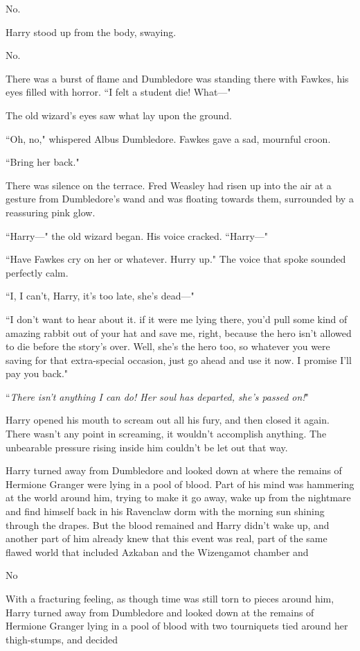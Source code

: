 No.

Harry stood up from the body, swaying.

No.

There was a burst of flame and Dumbledore was standing there with Fawkes, his eyes filled with horror. ``I felt a student die! What---"

The old wizard's eyes saw what lay upon the ground.

``Oh, no," whispered Albus Dumbledore. Fawkes gave a sad, mournful croon.

``Bring her back."

There was silence on the terrace. Fred Weasley had risen up into the air at a gesture from Dumbledore's wand and was floating towards them, surrounded by a reassuring pink glow.

``Harry---" the old wizard began. His voice cracked. ``Harry---"

``Have Fawkes cry on her or whatever. Hurry up." The voice that spoke sounded perfectly calm.

``I, I can't, Harry, it's too late, she's dead---"

``I don't want to hear about it. if it were me lying there, you'd pull some kind of amazing rabbit out of your hat and save me, right, because the hero isn't allowed to die before the story's over. Well, she's the hero too, so whatever you were saving for that extra-special occasion, just go ahead and use it now. I promise I'll pay you back."

``\emph{There isn't anything I can do! Her soul has departed, she's passed on!}"

Harry opened his mouth to scream out all his fury, and then closed it again. There wasn't any point in screaming, it wouldn't accomplish anything. The unbearable pressure rising inside him couldn't be let out that way.

Harry turned away from Dumbledore and looked down at where the remains of Hermione Granger were lying in a pool of blood. Part of his mind was hammering at the world around him, trying to make it go away, wake up from the nightmare and find himself back in his Ravenclaw dorm with the morning sun shining through the drapes. But the blood remained and Harry didn't wake up, and another part of him already knew that this event was real, part of the same flawed world that included Azkaban and the Wizengamot chamber and

No

With a fracturing feeling, as though time was still torn to pieces around him, Harry turned away from Dumbledore and looked down at the remains of Hermione Granger lying in a pool of blood with two tourniquets tied around her thigh-stumps, and decided

